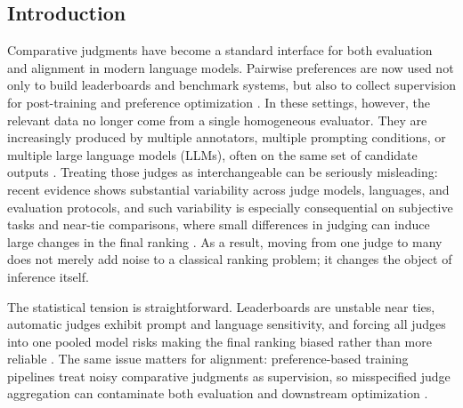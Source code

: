 \documentclass{article}
\begin{document}
\begin{bibunit}[unsrtnat]





\section{Introduction}


Comparative judgments have become a standard interface for both evaluation and alignment in modern language models. Pairwise preferences are now used not only to build leaderboards and benchmark systems, but also to collect supervision for post-training and preference optimization \citep{bradley1952rank,hunter2004mm,zheng2023mtbench,christiano2017preferences,ouyang2022instructgpt,rafailov2023dpo}. 
In these settings, however, the relevant data no longer come from a single homogeneous evaluator. 
They are increasingly produced by multiple annotators, multiple prompting conditions, or multiple large language models (LLMs), often on the same set of candidate outputs \citep{chen2013crowdbt,otani2016irt,zhao2025lmc,dhurandhar2024ranking}. 
Treating those judges as interchangeable can be seriously misleading: recent evidence shows substantial variability across judge models, languages, and evaluation protocols, and such variability is especially consequential on subjective tasks and near-tie comparisons, where small differences in judging can induce large changes in the final ranking \citep{bavaresco2025llmjudges,fu2025multilingualjudge,guerdan2025indeterminacy,gao2025reevaluating}. As a result, moving from one judge to many does not merely add noise to a classical ranking problem; it changes the object of inference itself.



The statistical tension is straightforward. 
Leaderboards are unstable near ties, automatic judges exhibit prompt and language sensitivity, and forcing all judges into one pooled model risks making the final ranking biased rather than more reliable \citep{bavaresco2025llmjudges,fu2025multilingualjudge,guerdan2025indeterminacy,gao2025reevaluating,xu2026judgeaware}. 
The same issue matters for alignment: preference-based training pipelines treat noisy comparative judgments as supervision, so misspecified judge aggregation can contaminate both evaluation and downstream optimization \citep{christiano2017preferences,ouyang2022instructgpt,rafailov2023dpo,xu2025drpo}.



\end{bibunit}
\end{document}
